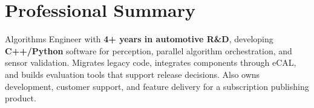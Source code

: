 \section*{Professional Summary}
\begin{center}
    \begin{minipage}{0.97\textwidth}
        \small{Algorithms Engineer with \textbf{4+ years in automotive R\&D}, developing \textbf{C++/Python} software for perception, parallel algorithm orchestration, and sensor validation. Migrates legacy code, integrates components through eCAL, and builds evaluation tools that support release decisions. Also owns development, customer support, and feature delivery for a subscription publishing product.}
    \end{minipage}
\end{center}
\vspace{-5pt}